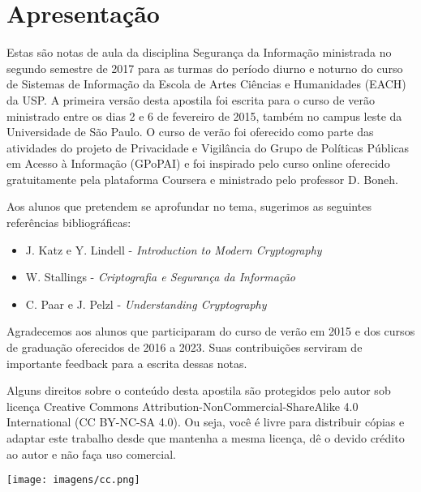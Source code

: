 ﻿\chapter*{Apresentação}

Estas são notas de aula da disciplina Segurança da Informação ministrada no segundo semestre de 2017 para as turmas do período diurno e noturno do curso de Sistemas de Informação da Escola de Artes Ciências e Humanidades (EACH) da USP.
A primeira versão desta apostila foi escrita para o curso de verão ministrado entre os dias 2 e 6 de fevereiro de 2015, também no campus leste da Universidade de São Paulo.
O curso de verão foi oferecido como parte das atividades do projeto de Privacidade e Vigilância do Grupo de Políticas Públicas em Acesso à Informação (GPoPAI) e foi inspirado pelo curso online oferecido gratuitamente pela plataforma Coursera e ministrado pelo professor D. Boneh.

Aos alunos que pretendem se aprofundar no tema, sugerimos as seguintes referências bibliográficas:

\begin{itemize}
\item J. Katz e Y. Lindell - {\em Introduction to Modern Cryptography}
\item W. Stallings - {\em Criptografia e Segurança da Informação}
\item C. Paar e J. Pelzl - {\em Understanding Cryptography}
\end{itemize}

Agradecemos aos alunos que participaram do curso de verão em 2015 e dos cursos de graduação oferecidos de 2016 a 2023. Suas contribuições serviram de importante feedback para a escrita dessas notas.

Alguns direitos sobre o conteúdo desta apostila são protegidos pelo autor sob licença Creative Commons
Attribution-NonCommercial-ShareAlike 4.0 International (CC BY-NC-SA 4.0). Ou seja, você  é livre para distribuir cópias e adaptar este trabalho desde que mantenha a mesma licença, dê o devido crédito ao autor e não faça uso comercial.

\begin{center}
  \texttt{[image: imagens/cc.png]}
\end{center}
